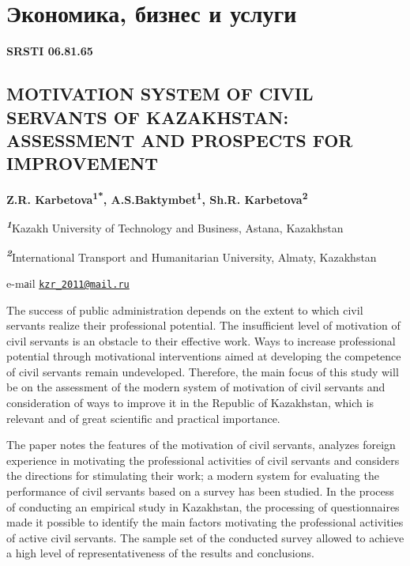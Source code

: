 \let\cleardoublepage\clearpage
\chapter{Экономика, бизнес и услуги}

{\bfseries SRSTI 06.81.65}

\section{MOTIVATION SYSTEM OF CIVIL SERVANTS OF KAZAKHSTAN: ASSESSMENT
AND PROSPECTS FOR IMPROVEMENT}

\begin{center}
{\bfseries Z.R. Karbetova\textsuperscript{1*},
A.S.Baktymbet\textsuperscript{1}, Sh.R. Karbetova\textsuperscript{2}}

\emph{{\bfseries \textsuperscript{1}}}Kazakh University of Technology and
Business, Astana, Kazakhstan

\emph{{\bfseries \textsuperscript{2}}}International Transport and
Humanitarian University, Almaty, Kazakhstan

e-mаil \href{mailto:kzr_2011@mail.ru}{\nolinkurl{kzr\_2011@mail.ru}}
\end{center}

The success of public administration depends on the extent to which
civil servants realize their professional potential. The insufficient
level of motivation of civil servants is an obstacle to their effective
work. Ways to increase professional potential through motivational
interventions aimed at developing the competence of civil servants
remain undeveloped. Therefore, the main focus of this study will be on
the assessment of the modern system of motivation of civil servants and
consideration of ways to improve it in the Republic of Kazakhstan, which
is relevant and of great scientific and practical importance.

The paper notes the features of the motivation of civil servants,
analyzes foreign experience in motivating the professional activities of
civil servants and considers the directions for stimulating their work;
a modern system for evaluating the performance of civil servants based
on a survey has been studied. In the process of conducting an empirical
study in Kazakhstan, the processing of questionnaires made it possible
to identify the main factors motivating the professional activities of
active civil servants. The sample set of the conducted survey allowed to
achieve a high level of representativeness of the results and
conclusions.


